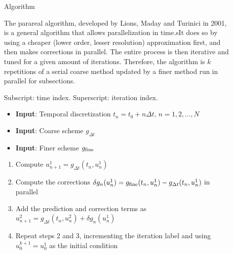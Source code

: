 \documentclass[final]{beamer}
\newlength{\sepwid}
\newlength{\onecolwid}
\begin{document}
\begin{frame}[t]
\begin{columns}[t]
\begin{column}{\onecolwid}
\begin{block}{Algorithm}

The parareal algorithm, developed by Lions, Maday and Turinici in 2001, is
a general algorithm that allows parallelization in time.sIt does so by using a
cheaper (lower order, lesser resolution) approximation first, and then makes
corrections in parallel. The entire process is then iterative and tuned for a
given amount of iterations. Therefore, the algorithm is $k$ repetitions of a
serial coarse method updated by a finer method run in parallel for subsections.

Subscript: time index. Superscript: iteration index.

\begin{itemize}
    \item \textbf{Input}: Temporal discretization $t_n = t_0 + n \Delta t, \, n =
        1,2,\ldots,N$
    \item \textbf{Input}: Coarse scheme $g_{\Delta t}$
    \item \textbf{Input}: Finer scheme $g_{\textnormal{fine}}$
\end{itemize}

\begin{enumerate}
    \item Compute $u^1_{n+1} = g_{\Delta t}(t_n, u^1_n)$
    \item Compute the corrections $\delta g_n(u^1_n) =
        g_{\textnormal{fine}}(t_n, u^1_n) - g_{\Delta t}(t_n, u^1_n)$ in parallel
    \item Add the prediction and correction terms as $u^2_{n+1} = g_{\Delta
        t}(t_n, u^2_n) + \delta g_n(u^1_n)$
    \item Repeat steps 2 and 3, incrementing the iteration label and using
        $u^{k+1}_0 = u^1_0$ as the initial condition
\end{enumerate}
\end{block}



\end{column} %

\begin{column}{\sepwid}\end{column} %

\begin{column}{\onecolwid} %


\end{column}
\end{columns}
\end{frame}
\end{document}
